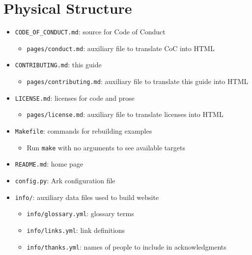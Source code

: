 \documentclass[krantzl]{krantz}
\begin{document}
\section{Physical Structure}
\begin{itemize}
\item \texttt{CODE\_OF\_CONDUCT.md}: source for Code of Conduct\begin{itemize}
\item \texttt{pages/conduct.md}: auxiliary file to translate CoC into HTML

\end{itemize}


\item \texttt{CONTRIBUTING.md}: this guide\begin{itemize}
\item \texttt{pages/contributing.md}: auxiliary file to translate this guide into HTML

\end{itemize}


\item \texttt{LICENSE.md}: licenses for code and prose\begin{itemize}
\item \texttt{pages/license.md}: auxiliary file to translate licenses into HTML

\end{itemize}


\item \texttt{Makefile}: commands for rebuilding examples\begin{itemize}
\item Run \texttt{make} with no arguments to see available targets

\end{itemize}


\item \texttt{README.md}: home page

\item \texttt{config.py}: Ark configuration file

\item \texttt{info/}: auxiliary data files used to build website\begin{itemize}
\item \texttt{info/glossary.yml}: glossary terms

\item \texttt{info/links.yml}: link definitions

\item \texttt{info/thanks.yml}: names of people to include in acknowledgments


\end{itemize}
\end{itemize}
\end{document}
